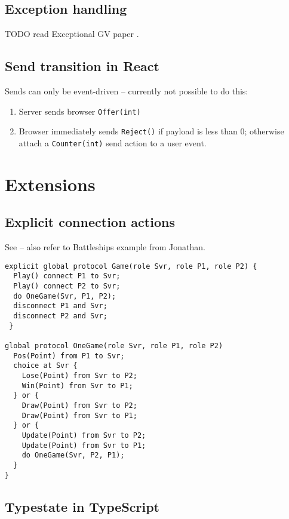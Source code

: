 \documentclass{article}
\begin{document}
\subsection*{Exception handling}

TODO read Exceptional GV paper \cite{ExceptionalGV}.

\subsection*{Send transition in React}
Sends can only be event-driven --
currently not possible to do this:

\begin{enumerate}
\item Server sends browser 
\texttt{Offer(int)}
\item Browser immediately sends 
\texttt{Reject()} if payload is less than 0;
otherwise attach a \texttt{Counter(int)} 
send action to a user event.
\end{enumerate}

\section{Extensions}

\subsection*{Explicit connection actions}

See \cite{FASE2017} -- also refer to Battleships 
example from Jonathan.

\begin{lstlisting}
explicit global protocol Game(role Svr, role P1, role P2) {
  Play() connect P1 to Svr;
  Play() connect P2 to Svr;
  do OneGame(Svr, P1, P2);
  disconnect P1 and Svr;
  disconnect P2 and Svr;
 }

global protocol OneGame(role Svr, role P1, role P2)
  Pos(Point) from P1 to Svr;
  choice at Svr {
    Lose(Point) from Svr to P2;
    Win(Point) from Svr to P1;
  } or {
    Draw(Point) from Svr to P2;
    Draw(Point) from Svr to P1;
  } or {
    Update(Point) from Svr to P2;
    Update(Point) from Svr to P1;
    do OneGame(Svr, P2, P1);
  }
}

\end{lstlisting}

\subsection*{Typestate in TypeScript}
\end{document}
